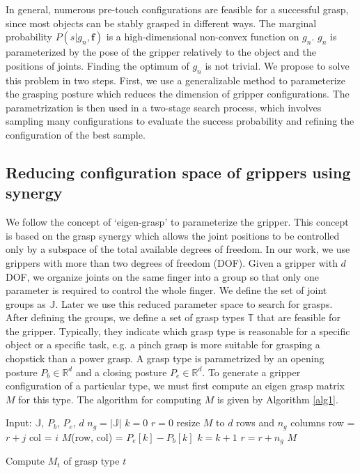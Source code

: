 In general, numerous pre-touch configurations are feasible for a successful grasp, since most objects can be stably grasped in different ways. The marginal probability $P(s|g_n,\bm{f})$ is a high-dimensional non-convex function on $g_n$. $g_n$ is parameterized by the pose of the gripper relatively to the object and the positions of joints. Finding the optimum of $g_n$ is not trivial. We propose to solve this problem in two steps. First, we use a generalizable method to parameterize the grasping posture which reduces the dimension of gripper configurations. The parametrization is then used in a two-stage search process, which involves sampling many configurations to evaluate the success probability and refining the configuration of the best sample.    

\subsection{Reducing configuration space of grippers using synergy }\label{sec:gripper_parametrization}

We follow the concept of `eigen-grasp'\cite{Ciocarlie2009} to parameterize the gripper. This concept is based on the grasp synergy which allows the joint positions to be controlled only by a subspace of the total available degrees of freedom. In our work, we use grippers with more than two degrees of freedom (DOF). Given a gripper with $d$ DOF, we organize joints on the same finger into a group so that only one parameter is required to control the whole finger. We define the set of joint groups as $\mathbb{J}$. Later we use this reduced parameter space to search for grasps. After defining the groups, we define a set of grasp types $\mathbb{T}$ that are feasible for the gripper. Typically, they indicate which grasp type is reasonable for a specific object or a specific task, e.g. a pinch grasp is more suitable for grasping a chopstick than a power grasp. A grasp type is parametrized by an opening posture $P_b \in\mathbb{R}^d$  and a closing posture $P_e \in\mathbb{R}^d$. To generate a gripper configuration of a particular type, we must first compute an eigen grasp matrix  $M$ for this type. The algorithm for computing $M$ is given by Algorithm \ref{alg1}. 

\begin{algorithm}
\begin{algorithmic}[1]
\STATE Input:  $\mathbb{J}$, $P_b$, $P_e$, $d$   
\STATE $n_g  =  |\mathbb{J}| $
\STATE $k = 0$ %
\STATE $r = 0$ %
\STATE resize $M$ to $d$ rows and $n_g$ columns  
\STATE row = $r + j$ 
\STATE col = $i$   
\STATE $M$(row, col) = $P_e[k] - P_b[k]$
\STATE $k = k + 1$
\ENDFOR
\STATE $r = r + n_g$
\ENDFOR
\RETURN $M$
\caption {Compute $M_t$ of grasp type $t$}
\label{alg1}
\end{algorithmic}
\end{algorithm}

